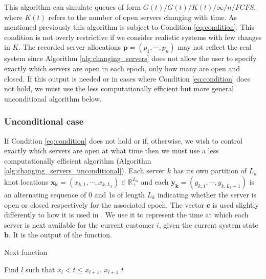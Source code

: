 \documentclass[article]{jss}
\begin{document}
This algorithm can simulate queues of form $G(t)/G(t)/K(t)/\infty/n/FCFS$, where $K(t)$ refers to the number of open servers changing with time. As mentioned previously this algorithm is subject to Condition \ref{eq:condition}. This condition is not overly restrictive if we consider realistic systems with few changes in $K$. The recorded server allocations $\mathbf{p} = (p_1, \cdots, p_n)$ may not reflect the real system since Algorithm \ref{alg:changing_servers} does not allow the user to specify exactly which servers are open in each epoch, only how many are open and closed. If this output is needed or in cases where Condition \ref{eq:condition} does not hold, we must use the less computationally efficient but more general unconditional algorithm below.  

\subsubsection{Unconditional case}

If Condition \ref{eq:condition} does not hold or if, otherwise, we wish to control exactly which servers are open at what time then we must use a less computationally efficient algorithm (Algorithm \ref{alg:changing_servers_unconditional}). Each server $k$ has its own partition of $L_k$ knot locations $\mathbf{x_k} = (x_{k,1}, \cdots, x_{k,L_k} ) \in \mathbb{R}^{L_k}_{+}$ and each $\mathbf{y_k} = (y_{k,1}, \cdots, y_{k,L_k+1} )$ is an alternating sequence of 0 and 1s of length $L_k$ indicating whether the server is open or closed respectively for the associated epoch. The vector $\mathbf{c}$ is used slightly differently to how it is used in \citet{sutton_bayesian_2011}. We use it to represent the time at which each server is next available for the current customer $i$, given the current system state $\mathbf{b}$. It is the output of the  function. 

\begin{algorithm}[ht!]
\caption{Next function}
\label{alg:next_fun}
\begin{algorithmic}
\State Find $l$ such that $x_{l} < t \leq x_{l+1}$.
\State \Return $x_{l+1}$
\Else
\State \Return $t$
\EndIf
\EndFunction
\end{algorithmic}
\end{algorithm}
\end{document}
